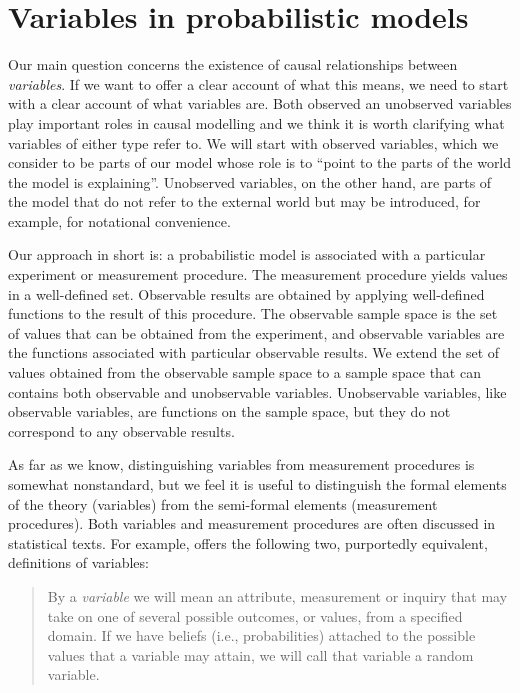 

\section{Variables in probabilistic models}\label{sec:variables}

Our main question concerns the existence of causal relationships between \emph{variables}. If we want to offer a clear account of what this means, we need to start with a clear account of what variables are. Both observed an unobserved variables play important roles in causal modelling and we think it is worth clarifying what variables of either type refer to. We will start with observed variables, which we consider to be parts of our model whose role is to ``point to the parts of the world the model is explaining''. Unobserved variables, on the other hand, are parts of the model that do not refer to the external world but may be introduced, for example, for notational convenience.

Our approach in short is: a probabilistic model is associated with a particular experiment or measurement procedure. The measurement procedure yields values in a well-defined set. Observable results are obtained by applying well-defined functions to the result of this procedure. The observable sample space is the set of values that can be obtained from the experiment, and observable variables are the functions associated with particular observable results. We extend the set of values obtained from the observable sample space to a sample space that can contains both observable and unobservable variables. Unobservable variables, like observable variables, are functions on the sample space, but they do not correspond to any observable results.

As far as we know, distinguishing variables from measurement procedures is somewhat nonstandard, but we feel it is useful to distinguish the formal elements of the theory (variables) from the semi-formal elements (measurement procedures). Both variables and measurement procedures are often discussed in statistical texts. For example, \citet{pearl_causality:_2009} offers the following two, purportedly equivalent, definitions of variables:
\begin{quote}
By a \emph{variable} we will mean an attribute, measurement or inquiry that may take on one of several possible outcomes, or values, from a specified domain. If we have beliefs (i.e., probabilities) attached to the possible values that a variable may attain, we will call that variable a random variable.
\end{quote}

